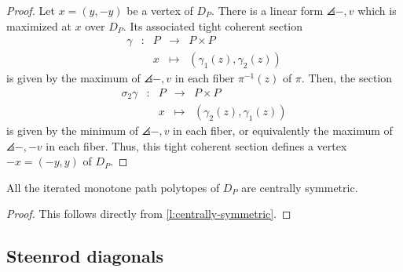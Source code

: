 \begin{proof}
	Let $x = (y,-y)$ be a vertex of $D_P$.
	There is a linear form $\angles{-,v}$ which is maximized at $x$ over $D_P$.
	Its associated tight coherent section
	\begin{equation*}
		\begin{matrix}
			\gamma & : & P & \to & P \times P \\
			& & x & \mapsto & (\gamma_1(z),\gamma_2(z))
		\end{matrix}
	\end{equation*}
	is given by the maximum of $\angles{-,v}$ in each fiber $\pi^{-1}(z)$ of $\pi$.
	Then, the section
	\begin{equation*}
		\begin{matrix}
			\sigma_2\gamma & : & P & \to & P \times P \\
			& & x & \mapsto & (\gamma_2(z),\gamma_1(z))
		\end{matrix}
	\end{equation*}
	is given by the minimum of $\angles{-,v}$ in each fiber, or equivalently the maximum of $\angles{-,-v}$ in each fiber.
	Thus, this tight coherent section defines a vertex $-x=(-y,y)$ of $D_P$.
\end{proof}


\begin{corollary}
	All the iterated monotone path polytopes of $D_P$ are centrally symmetric.   
\end{corollary}

\begin{proof}
	This follows directly from \cref{l:centrally-symmetric}.
\end{proof}

\subsection{Steenrod diagonals}

%


